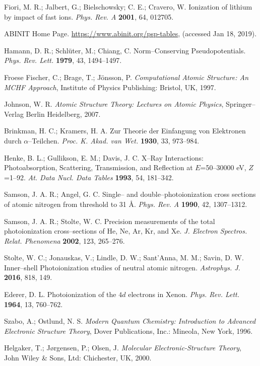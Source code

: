 \documentclass[10pt]{article}
\begin{document}
\begin{thebibliography}{10}
Fiori, M. R.; Jalbert, G.; Bielschowsky; C. E.; Cravero, W.
Ionization of lithium by impact of fast ions.
{\it Phys. Rev. A} {\bf 2001}, 64, 012705.

ABINIT Home Page. 
\url{https://www.abinit.org/psp-tables},
(accessed Jan 18, 2019).

Hamann, D. R.; Schl\"uter, M.; Chiang, C.
Norm--Conserving Pseudopotentials.
{\it Phys. Rev. Lett.} {\bf 1979}, 43, 1494--1497.

Froese Fischer, C.; Brage, T.; J\"onsson, P.
{\it Computational Atomic Structure: An MCHF Approach},
Institute of Physics Publishing: Bristol, UK, 1997.

Johnson, W. R. 
{\it Atomic Structure Theory: Lectures on Atomic Physics},
Springer--Verlag Berlin Heidelberg, 2007.

Brinkman, H. C.; Kramers, H. A.
Zur Theorie der Einfangung von Elektronen durch $\alpha$--Teilchen.
{\it Proc. K. Akad. van Wet.} {\bf 1930}, 33, 973--984.

Henke, B. L.; Gullikson, E. M.; Davis, J. C. 
X--Ray Interactions: Photoabsorption, Scattering, Transmission, and Reflection at $E$=50--30000 eV, $Z$=1--92.
{\it At. Data Nucl. Data Tables} {\bf 1993}, 54, 181--342.

Samson, J. A. R.; Angel, G. C.
Single-- and double--photoionization cross sections of atomic nitrogen from threshold to 31 \AA.
{\it Phys. Rev. A} {\bf 1990}, 42, 1307--1312.

Samson, J. A. R.; Stolte, W. C.
Precision measurements of the total photoionization cross--sections of He, Ne, Ar, Kr, and Xe.
{\it J. Electron Spectros. Relat. Phenomena} {\bf 2002}, 123, 265--276.

Stolte, W. C.; Jonauskas, V.; Lindle, D. W.; Sant'Anna, M. M.; Savin, D. W. 
Inner--shell Photoionization studies of neutral atomic nitrogen.
{\it Astrophys. J.} {\bf 2016}, 818, 149.

Ederer, D. L. 
Photoionization of the $4d$ electrons in Xenon.
{\it Phys. Rev. Lett.} {\bf 1964}, 13, 760--762.

Szabo, A.; Ostlund, N. S.
{\it Modern Quantum Chemistry: Introduction to Advanced Electronic 
Structure Theory},
Dover Publications, Inc.: Mineola, New York, 1996.

Helgaker, T.; J{\o}rgensen, P.; Olsen, J.
{\it Molecular Electronic-Structure Theory},
John Wiley {\&} Sons, Ltd: Chichester, UK, 2000.


\end{thebibliography}
\end{document}
